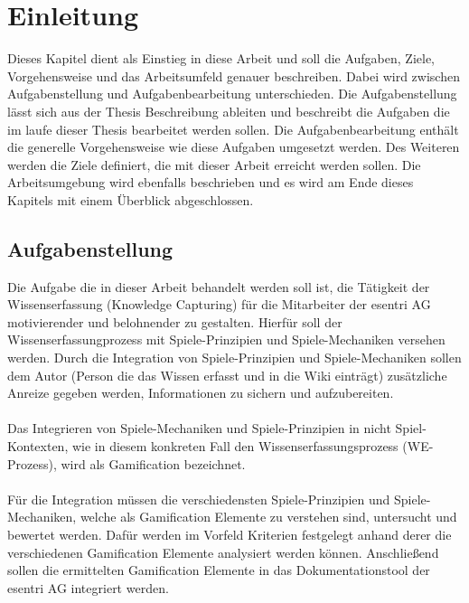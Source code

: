 \documentclass[a4paper,12pt,twoside]{scrartcl}
\begin{document}
\cleardoublepage

\section{Einleitung}
Dieses Kapitel dient als Einstieg in diese Arbeit und soll die Aufgaben, Ziele, Vorgehensweise und das Arbeitsumfeld genauer beschreiben. Dabei wird zwischen Aufgabenstellung und Aufgabenbearbeitung unterschieden. Die Aufgabenstellung lässt sich aus der Thesis Beschreibung ableiten und beschreibt die Aufgaben die im laufe dieser Thesis bearbeitet werden sollen. Die Aufgabenbearbeitung enthält die generelle Vorgehensweise wie diese Aufgaben umgesetzt werden. Des Weiteren werden die Ziele definiert, die mit dieser Arbeit erreicht werden sollen. Die Arbeitsumgebung wird ebenfalls beschrieben und es wird am Ende dieses Kapitels mit einem Überblick abgeschlossen. 
\subsection{Aufgabenstellung}
Die Aufgabe die in dieser Arbeit behandelt werden soll ist, die Tätigkeit der Wissenserfassung (Knowledge Capturing) für die Mitarbeiter der esentri AG motivierender und belohnender zu gestalten. Hierfür soll der Wissenserfassungprozess mit Spiele-Prinzipien und Spiele-Mechaniken versehen werden. Durch die Integration von Spiele-Prinzipien und Spiele-Mechaniken sollen dem Autor (Person die das Wissen erfasst und in die Wiki einträgt) zusätzliche Anreize gegeben werden, Informationen zu sichern und aufzubereiten. 
\\\\
Das Integrieren von Spiele-Mechaniken und Spiele-Prinzipien in nicht Spiel-Kontexten, wie in diesem konkreten Fall den Wissenserfassungsprozess (WE-Prozess), wird als Gamification bezeichnet.
\\\\
Für die Integration müssen die verschiedensten Spiele-Prinzipien und Spiele-Mechaniken, welche als Gamification Elemente zu verstehen sind, untersucht und bewertet werden. Dafür werden im Vorfeld Kriterien festgelegt anhand derer die verschiedenen Gamification Elemente analysiert werden können. Anschließend sollen die ermittelten Gamification Elemente in das Dokumentationstool der esentri AG integriert werden. 
\end{document}

